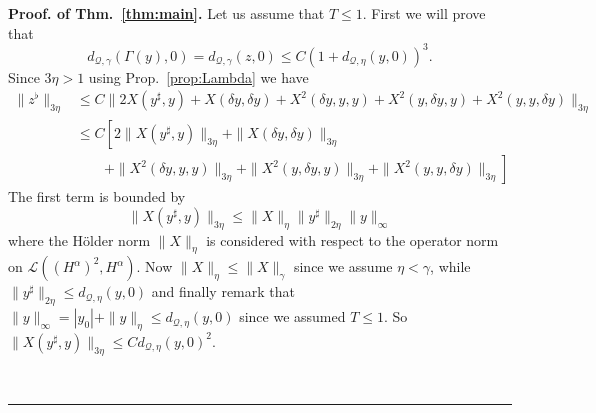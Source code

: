 \documentclass[a4paper,11pt,reqno]{article}
\newcommand{\der}{\delta}
\newcommand{\QQ}{\mathcal{Q}}
\newcommand{\LL}{\mathcal{L}}
\newenvironment{proof}[1][Proof]{\textbf{#1.} }{\ \rule{0.5em}{0.5em}}
\begin{document}
\begin{proof}[Proof. of Thm.~\ref{thm:main}]
Let us assume that $T \le 1$.
First we will prove that
\begin{equation}
  \label{eq:bound-on-Gamma}
  d_{\QQ,\gamma}(\Gamma(y),0) = d_{\QQ,\gamma}(z,0) \le C (1+d_{\QQ,\eta}(y,0))^3.
\end{equation}
Since $3\eta > 1$ using Prop.~\ref{prop:Lambda} we have
\begin{equation}
\label{eq:flat-bound}
  \begin{split}
\|z^{\flat}\|_{3\eta} & \le C \|2 X(y^\sharp,y) 
+ X(\der y,\der y) 
 + X^2(\der y,y,y) +
X^2(y,\der y,y) + X^2( y,y,\der y) \|_{3\eta}
\\ & \le C \left[ 2\| X(y^\sharp,y) \|_{3\eta}
+ \|X(\der y,\der y)\|_{3\eta} 
\right. \\ & \qquad \left. + \|X^2(\der y,y,y)\|_{3\eta} +
\|X^2(y,\der y,y)\|_{3\eta} + \|X^2( y,y,\der y) \|_{3\eta}\right]
  \end{split}
\end{equation}
The first term is bounded by
$$
\| X(y^\sharp,y) \|_{3\eta} \le \|X\|_{\eta} \|y^\sharp\|_{2\eta} \|y\|_{\infty}
$$
where the H\"older norm $\|X\|_{\eta}$ is considered with respect to
the operator norm on $\LL((H^\alpha)^2,H^\alpha)$. Now
$\|X\|_\eta \le \|X\|_\gamma$ since we assume $\eta < \gamma$, while
$\|y^\sharp\|_{2\eta} \le d_{\QQ,\eta}(y,0)$ and finally 
remark that $\|y\|_{\infty} = |y_0|+ \|y\|_{\eta} \le
d_{\QQ,\eta}(y,0)$ since we assumed $T \le 1$. So  
$
\| X(y^\sharp,y) \|_{3\eta} \le C d_{\QQ,\eta}(y,0)^2
$.


\end{proof}
\end{document}
